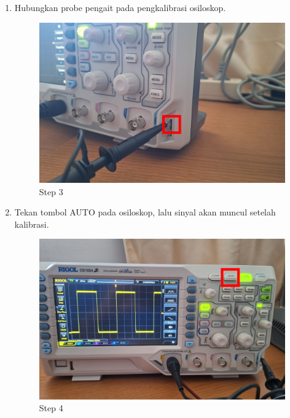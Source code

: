\begin{center}
\begin{enumerate}
		\item Hubungkan probe pengait pada pengkalibrasi osiloskop.
			\begin{figure}[H]
				\centering
				\includegraphics[width=0.8\linewidth]{P1/img/per 1/step 3.png}
				\caption{Step 3}
				\label{fig:Step 3(Group 15)}
			\end{figure}

	\item Tekan tombol AUTO pada osiloskop, lalu sinyal akan muncul setelah kalibrasi.
	\begin{figure}[H]
		\centering
		\includegraphics[width=0.8\linewidth]{P1/img/per 1/step 4.png}
		\caption{Step 4}
		\label{fig:Ping Step 4(Group 4)}
	\end{figure}
	\end{enumerate}
\end{center}

